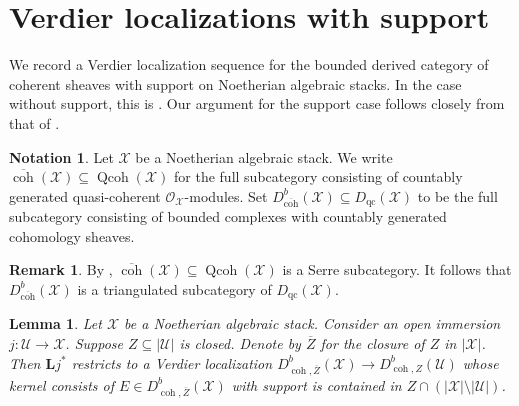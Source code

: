 \documentclass[11pt]{amsart}
\theoremstyle{plain}
\newtheorem{lemma}[theorem]{Lemma}
\theoremstyle{definition}
\newtheorem{remark}[theorem]{Remark}
\newtheorem{notation}[theorem]{Notation}
\numberwithin{equation}{section}
\numberwithin{theorem}{section}
\begin{document}
\appendix

\section{Verdier localizations with support}

We record a Verdier localization sequence for the bounded derived category of coherent sheaves with support on Noetherian algebraic stacks. 
In the case without support, this is \cite[Proposition B.1]{Hall/Lamarche/Lank/Peng:2025}. 
Our argument for the support case follows closely from that of \cite[Proposition B.1]{Hall/Lamarche/Lank/Peng:2025}. 

\begin{notation}
    Let $\mathcal{X}$ be a Noetherian algebraic stack. 
    We write $\overline{\operatorname{coh}}(\mathcal{X})\subseteq\operatorname{Qcoh}(\mathcal{X})$ for the full subcategory consisting of countably generated quasi-coherent $\mathcal{O_X}$-modules. 
    Set $D_{\overline{\operatorname{coh}}}^b(\mathcal{X})\subseteq D_{\operatorname{qc}}(\mathcal{X})$ to be the full subcategory consisting of bounded complexes with countably generated cohomology sheaves. 
\end{notation}
 
\begin{remark}
    By \cite[Lemma A.1]{Hall:2022}, $\overline{\operatorname{coh}}(\mathcal{X})\subseteq\operatorname{Qcoh}(\mathcal{X})$ is a Serre subcategory. 
    It follows that $D_{\overline{\operatorname{coh}}}^b(\mathcal{X})$ is a triangulated subcategory of $D_{\operatorname{qc}}(\mathcal{X})$.
\end{remark}

\begin{lemma}
    \label{lem:relative_denseness_open_immersion}
    Let $\mathcal{X}$ be a Noetherian algebraic stack. 
    Consider an open immersion $j\colon \mathcal{U} \to \mathcal{X}$. 
    Suppose $Z\subseteq |\mathcal{U}|$ is closed. 
    Denote by $\overline{Z}$ for the closure of $Z$ in $|\mathcal{X}|$. 
    Then $\mathbf{L} j^\ast$ restricts to a Verdier localization $D^b_{\operatorname{coh},\overline{Z}} (\mathcal{X}) \to D^b_{\operatorname{coh},Z}(\mathcal{U})$ whose kernel consists of $E\in D^b_{\operatorname{coh},\overline{Z}} (\mathcal{X})$ with support is contained in $Z\cap (|\mathcal{X}|\setminus |\mathcal{U}|)$.
\end{lemma}
\end{document}
